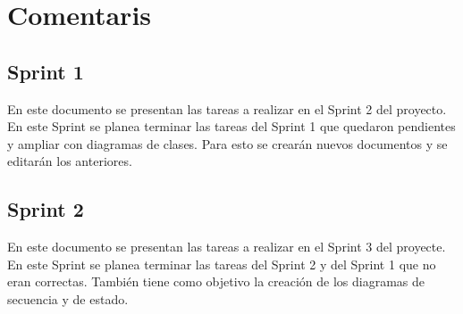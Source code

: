 \section{Comentaris}


\subsection{Sprint 1}

En este documento se presentan las tareas a realizar en el Sprint 2 del proyecto. En este Sprint se planea terminar las tareas del Sprint 1 que quedaron pendientes y ampliar con diagramas de clases. Para esto se crearán nuevos documentos y se editarán los anteriores.


\subsection{Sprint 2}
En este documento se presentan las tareas a realizar en el Sprint 3 del proyecte. En este Sprint se planea terminar las tareas del Sprint 2 y del Sprint 1 que no eran correctas. También tiene como objetivo la creación de los diagramas de secuencia y de estado.

